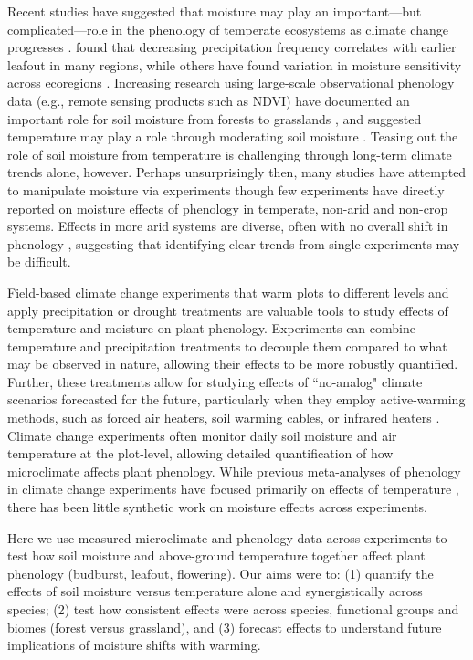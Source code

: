 \documentclass{article}
\begin{document}
\par Recent studies have suggested that moisture may play an important---but complicated---role in the phenology of temperate ecosystems as climate change progresses \citep[e.g.,][]{seyed2018,wang2022}. \citet{wang2022} found that decreasing precipitation frequency correlates with earlier leafout in many regions, while others have found variation in moisture sensitivity across ecoregions \citep{seyed2018}. Increasing research using large-scale observational phenology data (e.g., remote sensing products such as NDVI) have documented an important role for soil moisture from forests to grasslands \citep{lian2020summer,shen2022plant,liu2024soil}, and suggested temperature may play a role through moderating soil moisture \citep{liu2024soil}. Teasing out the role of soil moisture from temperature is challenging through long-term climate trends alone, however. Perhaps unsurprisingly then, many studies have attempted to manipulate moisture via experiments \citep[e.g.,][]{morin2010,hoeppner2012,rollinson2012b,clark2014a} though few experiments have directly reported on moisture effects of phenology in temperate, non-arid and non-crop systems. Effects in more arid systems are diverse, often with no overall shift in phenology \citep[e.g.,][]{sherry2007,de2017challenging,howell2020}, suggesting that identifying clear trends from single experiments may be difficult. 

\par Field-based climate change experiments that warm plots to different levels and apply precipitation or drought treatments are valuable tools to study effects of temperature and moisture on plant phenology. Experiments can combine temperature and precipitation treatments to decouple them compared to what may be observed in nature, allowing their effects to be more robustly quantified. Further, these treatments allow for studying effects of ``no-analog" climate scenarios forecasted for the future, particularly when they employ active-warming methods, such as forced air heaters, soil warming cables, or infrared heaters \citep{shaver2000,williams2007b,aronson2009}. Climate change experiments often monitor daily soil moisture and air temperature at the plot-level, allowing detailed quantification of how microclimate affects plant phenology. While previous meta-analyses of phenology in climate change experiments have focused primarily on effects of temperature \citep[e.g.,][]{wolkovich2012a}, there has been little synthetic work on moisture effects across experiments. 
\par Here we use measured microclimate and phenology data across experiments to test how soil moisture and above-ground temperature together affect plant phenology (budburst, leafout, flowering). Our aims were to: (1) quantify the effects of soil moisture versus temperature alone and synergistically across species; (2) test how consistent effects were across species, functional groups and biomes (forest versus grassland), and (3) forecast effects to understand future implications of moisture shifts with warming. 
\end{document}
